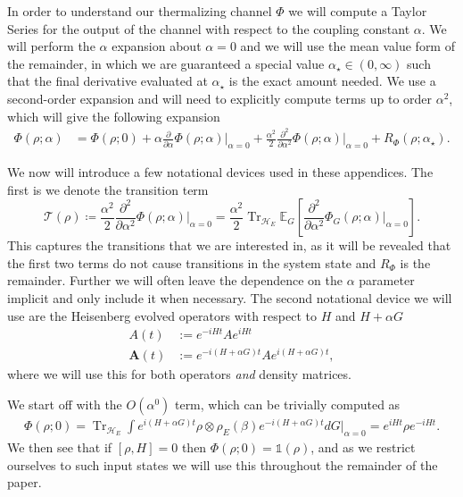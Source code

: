 \documentclass[
 amsmath,amssymb,
 aps,
onecolumn, 
nofootinbib]{revtex4-2}
\newcommand{\bigo}[1]{O\left(#1\right)}
\DeclareMathOperator{\Tr}{Tr}
\newcommand{\hilb}{\mathcal{H}}
\newcommand{\identity}{\mathds{1}}
\begin{document}
In order to understand our thermalizing channel $\Phi$ we will compute a Taylor Series for the output of the channel with respect to the coupling constant $\alpha$. We will perform the $\alpha$ expansion about $\alpha = 0$ and we will use the mean value form of the remainder, in which we are guaranteed a special value $\alpha_{\star} \in (0, \infty)$ such that the final derivative evaluated at $\alpha_{\star}$ is the exact amount needed. We use a second-order expansion and will need to explicitly compute terms up to order $\alpha^2$, which will give the following expansion
\begin{align}
    \Phi(\rho; \alpha) &= \Phi(\rho; 0) + \alpha \frac{\partial}{\partial \alpha} \Phi(\rho; \alpha) \big|_{\alpha = 0} + \frac{\alpha^2}{2} \frac{\partial^2}{\partial \alpha^2} \Phi(\rho; \alpha) \big|_{\alpha = 0} + R_{\Phi}(\rho; \alpha_{\star}). \label{eq:phi_taylor_series}
\end{align}

We now will introduce a few notational devices used in these appendices. The first is we denote the transition term
\begin{equation}
    \mathcal{T}(\rho) \coloneqq \frac{\alpha^2}{2} \frac{\partial^2}{\partial \alpha^2} \Phi(\rho; \alpha) \bigg|_{\alpha = 0} = \frac{\alpha^2}{2}  \Tr_{\hilb_E} \mathbb{E}_{G} \left[\frac{\partial^2}{\partial \alpha^2} \Phi_G(\rho; \alpha) \big|_{\alpha = 0}\right]. \label{eq:transition_def}
\end{equation}
This captures the transitions that we are interested in, as it will be revealed that the first two terms do not cause transitions in the system state and $R_{\Phi}$ is the remainder. Further we will often leave the dependence on the  $\alpha$ parameter implicit and only include it when necessary. The second notational device we will use are the Heisenberg evolved operators with respect to $H$ and $H + \alpha G$
\begin{align}
    A(t) &:= e^{-i H t} A e^{i H t} \\
    \boldsymbol{A}(t) &:= e^{-i (H + \alpha G) t} A e^{i (H + \alpha G)t},
\end{align}
where we will use this for both operators \emph{and} density matrices. 


We start off with the $\bigo{\alpha^0}$ term, which can be trivially computed as
\begin{align}
\Phi(\rho; 0) = \Tr_{\hilb_E}\int e^{i(H + \alpha G) t} \rho \otimes \rho_E(\beta) e^{-i (H + \alpha G) t} dG \bigg|_{\alpha = 0} = e^{i H t} \rho e^{-i H t}.
\end{align}
We then see that if $[ \rho, H] = 0$ then $\Phi(\rho; 0) = \identity(\rho)$, and as we restrict ourselves to such input states we will use this throughout the remainder of the paper. 
\end{document}
